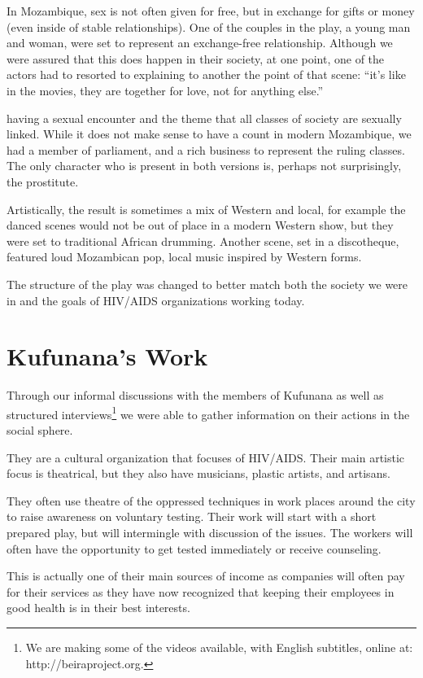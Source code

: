 \documentclass[article,twocolumn,twoside]{memoir}
\begin{document}
In Mozambique, sex is not often given for free, but in exchange for gifts or
money (even inside of stable relationships). One of the couples in the play, a
young man and woman, were set to represent an exchange-free relationship.
Although we were assured that this does happen in their society, at one point,
one of the actors had to resorted to explaining to another the point of that
scene: ``it's like in the movies, they are together for love, not for anything
else.''

having a sexual encounter and the theme that all classes of society are
sexually linked. While it does not make sense to have a count in modern
Mozambique, we had a member of parliament, and a rich business to represent the
ruling classes. The only character who is present in both versions is, perhaps
not surprisingly, the prostitute.

Artistically, the result is sometimes a mix of Western and local, for example
the danced scenes would not be out of place in a modern Western show, but they
were set to traditional African drumming. Another scene, set in a discotheque,
featured loud Mozambican pop, local music inspired by Western forms.

The structure of the play was changed to better match both the society we were
in and the goals of HIV/AIDS organizations working today.


\chapter{Kufunana's Work}

Through our informal discussions with the members of Kufunana as well as
structured interviews\footnote{We are making some of the videos available, with
English subtitles, online at: http://beiraproject.org.} we were able to gather
information on their actions in the social sphere.

They are a cultural organization that focuses of HIV/AIDS. Their main artistic
focus is theatrical, but they also have musicians, plastic artists, and
artisans.

They often use theatre of the oppressed techniques in work places around the
city to raise awareness on voluntary testing. Their work will start with a
short prepared play, but will intermingle with discussion of the issues. The
workers will often have the opportunity to get tested immediately or receive
counseling.

This is actually one of their main sources of income as companies will often
pay for their services as they have now recognized that keeping their employees
in good health is in their best interests.
\end{document}
